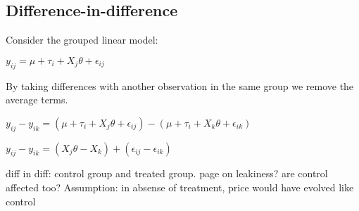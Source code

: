 
\subsection{Difference-in-difference}

Consider the grouped linear model: 

\(y_{ij}=\mu+\tau_i+X_{j}\theta +\epsilon_{ij}\)

By taking differences with another observation in the same group we remove the average terms.

\(y_{ij}-y_{ik}=(\mu+\tau_i+X_{j}\theta +\epsilon_{ij})- (\mu + \tau_i + X_{k}\theta + \epsilon_{ik})\)

\(y_{ij}-y_{ik}=(X_{j}\theta - X_{k})+(\epsilon_{ij}- \epsilon_{ik})\)



diff in diff: control group and treated group. page on leakiness? are control affected too? Assumption: in absense of treatment, price would have evolved like control

